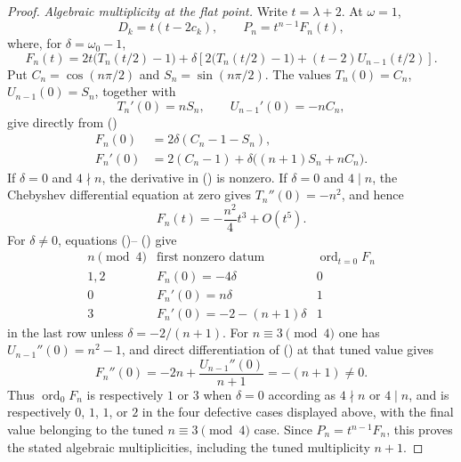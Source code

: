 \documentclass[twoside,10pt]{article}
\numberwithin{equation}{section}
\theoremstyle{slbody}
\theoremstyle{definition}
\theoremstyle{remark}
\renewcommand{\eqref}[1]{%
  \textup{{\normalfont(\oldstylenums{\ref{#1}}}\normalfont)}}
\begin{document}
\begin{proof}
\emph{Algebraic multiplicity at the flat point.}
Write $t=\lambda+2$.  At $\omega=1$,
\[
 D_k=t(t-2c_k),\qquad
 P_n=t^{n-1}F_n(t),
\]
where, for $\delta=\omega_0-1$,
\begin{equation}\label{eq:flat-F}
 F_n(t)=2t\bigl(T_n(t/2)-1\bigr)
 +\delta\left[2\bigl(T_n(t/2)-1\bigr)
 +(t-2)U_{n-1}(t/2)\right].
\end{equation}
Put $C_n=\cos(n\pi/2)$ and $S_n=\sin(n\pi/2)$.  The values
$T_n(0)=C_n$, $U_{n-1}(0)=S_n$, together with
\[
 T_n'(0)=nS_n,\qquad U_{n-1}'(0)=-nC_n,
\]
give directly from \eqref{eq:flat-F}
\begin{align}
 F_n(0)&=2\delta(C_n-1-S_n),\label{eq:flat-value}\\
 F_n'(0)&=2(C_n-1)
   +\delta\bigl((n+1)S_n+nC_n\bigr).
   \label{eq:flat-first-derivative}
\end{align}
If $\delta=0$ and $4\nmid n$, the derivative in
\eqref{eq:flat-first-derivative} is nonzero.  If $\delta=0$ and
$4\mid n$, the Chebyshev differential equation at zero gives
$T_n''(0)=-n^2$, and hence
\[
 F_n(t)=-\frac{n^2}{4}t^3+O(t^5).
\]
For $\delta\ne0$, equations
\eqref{eq:flat-value}--\eqref{eq:flat-first-derivative} give
\[
\begin{array}{c|c|c}
 n\pmod4 & \text{first nonzero datum} & \operatorname{ord}_{t=0}F_n\\
\hline
1,2 & F_n(0)=-4\delta &0\\
0   & F_n'(0)=n\delta &1\\
3   & F_n'(0)=-2-(n+1)\delta &1
\end{array}
\]
in the last row unless $\delta=-2/(n+1)$.  For
$n\equiv3\pmod4$ one has $U_{n-1}''(0)=n^2-1$, and direct
differentiation of \eqref{eq:flat-F} at that tuned value gives
\begin{equation}\label{eq:flat-second-derivative}
 F_n''(0)=-2n+\frac{U_{n-1}''(0)}{n+1}=-(n+1)\ne0.
\end{equation}
Thus $\operatorname{ord}_{0}F_n$ is respectively $1$ or $3$ when
$\delta=0$ according as $4\nmid n$ or $4\mid n$, and is respectively
$0$, $1$, $1$, or $2$ in the four defective cases displayed above,
with the final value belonging to the tuned $n\equiv3\pmod4$ case.
Since $P_n=t^{n-1}F_n$, this proves the stated algebraic
multiplicities, including the tuned multiplicity $n+1$.


\end{proof}
\end{document}

